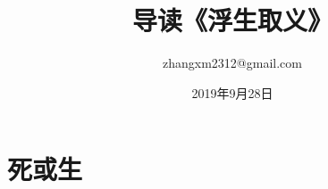 \documentclass[UTF8]{book}
\begin{document}
\renewcommand{\chaptername}{第 {\thechapter}章}
\newcommand{\sectionname}{节}
\renewcommand{\figurename}{图}
\renewcommand{\tablename}{表}
\renewcommand{\bibname}{参考文献}
\renewcommand{\contentsname}{目~录}
\renewcommand{\listfigurename}{图~目~录}
\renewcommand{\listtablename}{表~目~录}
\renewcommand{\indexname}{索~引}
\renewcommand{\abstractname}{\Large{摘~要}}
\renewcommand{\partname}{第  {\thepart} 部分}
\newcommand{\keywords}[1]{\\ \\ \textbf{关~键~词}：#1}
\titleformat{\chapter}[block]{\center\Large\bf}{\chaptername}{20pt}{}
\titleformat{\section}[block]{\large\bf}{\thesection}{10pt}{}

\title{导读《浮生取义》}
\author{zhangxm2312@gmail.com}
\date{2019年9月28日}
\maketitle

\chapter{死或生}
\end{document}

